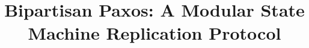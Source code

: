\documentclass[letterpaper,twocolumn,10pt]{article}
\begin{document}
\date{}

\title{Bipartisan Paxos: A Modular State Machine Replication Protocol}


\maketitle

{}
{}
{}
{}
{}
{}
{}
{}




\appendix
{}
\end{document}

